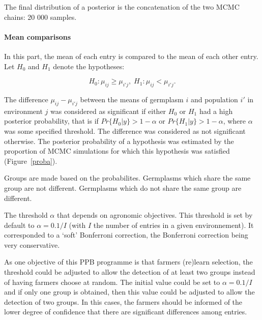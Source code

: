 \documentclass{book}\usepackage[]{graphicx}\usepackage[]{color}
\begin{document}
The final distribution of a posterior is the concatenation of the two MCMC chains: 20 000 samples.


\paragraph{Mean comparisons}
\label{mean_comp}

In this part, the mean of each entry is compared to the mean of each other entry.
Let $H_{0}$ and $H_{1}$ denote the hypotheses:

\begin{displaymath}
  H_{0} : \mu_{ij} \ge \mu_{i'j} , \; H_{1} : \mu_{ij} < \mu_{i'j}.
\end{displaymath}

The difference $\mu_{ij}-\mu_{i'j}$ between the means of germplasm $i$ and population $i'$ in environment $j$ was considered as significant if either $H_{0}$ or $H_{1}$ had a high posterior probability, that is if $Pr\{H_{0}|y\} > 1 - \alpha$ or $Pr\{H_{1}|y\}> 1 - \alpha$, where
$\alpha$ was some specified threshold.
The difference was considered as not significant otherwise.
The posterior probability of a hypothesis was estimated by the proportion of MCMC simulations for
which this hypothesis was satisfied (Figure~\ref{proba}).

Groups are made based on the probabilites.
Germplasms which share the same group are not different.
Germplasms which do not share the same group are different.

The threshold $\alpha$ that depends on agronomic objectives.
This threshold is set by default to $\alpha=0.1/I$ (with $I$ the number of entries in a given environnement).
It corresponded to a `soft' Bonferroni correction, the Bonferroni correction being very conservative.

As one objective of this PPB programme is that farmers (re)learn selection, the threshold could be adjusted to allow the detection of at least two groups instead of having farmers choose at random.
The initial value could be set to $\alpha=0.1/I$ and if only one group is obtained, then this value could be adjusted to allow the detection of two groups.
In this cases, the farmers should be informed of the lower degree of confidence that there are significant differences among entries.
\end{document}
